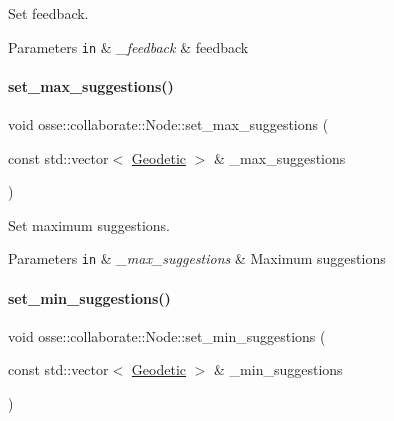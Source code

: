 Set feedback. 


\begin{DoxyParams}[1]{Parameters}
\mbox{\tt in}  & {\em \+\_\+feedback} & feedback \\
\hline
\end{DoxyParams}
\mbox{\label{classosse_1_1collaborate_1_1_node_a25761538070b7e3ff6e70204e034d4c0}} 
\paragraph{\texorpdfstring{set\+\_\+max\+\_\+suggestions()}{set\_max\_suggestions()}}
{\footnotesize\ttfamily void osse\+::collaborate\+::\+Node\+::set\+\_\+max\+\_\+suggestions (\begin{DoxyParamCaption}\item[{const std\+::vector$<$ \hyperlink{classosse_1_1collaborate_1_1_geodetic}{Geodetic} $>$ \&}]{\+\_\+max\+\_\+suggestions }\end{DoxyParamCaption})\hspace{0.3cm}{\ttfamily [inline]}}



Set maximum suggestions. 


\begin{DoxyParams}[1]{Parameters}
\mbox{\tt in}  & {\em \+\_\+max\+\_\+suggestions} & Maximum suggestions \\
\hline
\end{DoxyParams}
\mbox{\label{classosse_1_1collaborate_1_1_node_a1a00e90c98e919ec2ffe04543a6e3280}} 
\paragraph{\texorpdfstring{set\+\_\+min\+\_\+suggestions()}{set\_min\_suggestions()}}
{\footnotesize\ttfamily void osse\+::collaborate\+::\+Node\+::set\+\_\+min\+\_\+suggestions (\begin{DoxyParamCaption}\item[{const std\+::vector$<$ \hyperlink{classosse_1_1collaborate_1_1_geodetic}{Geodetic} $>$ \&}]{\+\_\+min\+\_\+suggestions }\end{DoxyParamCaption})\hspace{0.3cm}{\ttfamily [inline]}}



